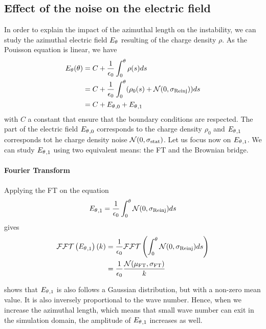   \subsection{Effect of the noise on the electric field}
    \label{sec-mathnoise}
    In order to explain the impact of the azimuthal length on the instability, we can study the azimuthal electric field ${E_{\theta}}$ resulting of the charge density $\rho$.
    As the Pouisson equation is linear, we have
    \begin{align}
      {\ensuremath{E_{\theta}}}(\theta) &= C + \frac{1}{\epsilon_0} \int_0^{\theta} \rho(s) ds\\
                    &= C + \frac{1}{\epsilon_0} \int_0^{\theta} (\rho_0(s) + \mathcal{N}(0, \sigma_{\rm Reinj}) ) ds \\ 
                    &= C + {E_{\theta}}_{, 0} + {E_{\theta}}_{, 1}
    \end{align}
    with $C$ a constant that ensure that the boundary conditions are respected.
    The part of the electric field ${E_{\theta}}_{, 0}$ corresponds to the charge density $\rho_0$ and ${E_{\theta}}_{, 1}$  corresponds tot he charge density noise $\mathcal{N}(0, \sigma_{\rm stat})$.
    Let us focus now on ${E_{\theta}}_{, 1}$.
    We can study ${E_{\theta}}_{, 1}$ using two equivalent means: the \ac{FT} and the Brownian bridge.
    
    \paragraph{Fourier Transform \\}
      Applying the \ac{FT} on the equation
      \begin{equation} \label{eq-aziE1}
        {\ensuremath{E_{\theta}}}_{, 1} = \frac{1}{\epsilon_0} \int_0^{\theta}  \mathcal{N}(0, \sigma_{\rm Reinj}) ds
      \end{equation}
      gives    
      \begin{align}
         \mathcal{FFT} \left( {E_{\theta}}_{, 1} \right) (k) &= \frac{1}{\epsilon_0}  \mathcal{FFT} \left( \int_0^{\theta}  \mathcal{N}(0, \sigma_{\rm Reinj}) ds \right) \\
                                     &= \frac{1}{\epsilon_0} \frac{ \mathcal{N}(\mu_{\rm FT}, \sigma_{\rm FT})}{k} \label{eq-fft}
      \end{align}
      
       shows that ${E_{\theta}}_{, 1}$ is also follows a Gaussian distribution, but with a non-zero mean value.
      It is also inversely proportional to the wave number.
      Hence, when we increase the azimuthal length, which means that small wave number can exit in the simulation domain, the amplitude of ${E_{\theta}}_{, 1}$ increases as well.
      
